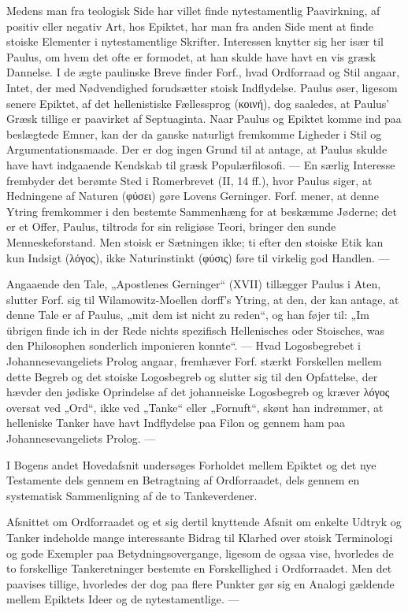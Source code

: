 \documentclass[12pt,a4paper,openany]{book}
\newcommand{\opage}[1]{\marginnote{\footnotesize\textit{[#1]}}}
\begin{document}
Medens man fra teologisk Side har villet finde nytestamentlig
Paavirkning, af positiv eller negativ Art, hos Epiktet,
har man fra anden Side ment at finde stoiske Elementer i nytestamentlige
Skrifter. Interessen knytter sig her især til Paulus,
om hvem det ofte er formodet, at han skulde have havt
en vis græsk Dannelse. I de ægte paulinske Breve finder Forf.,
hvad Ordforraad og Stil angaar, Intet, der med Nødvendighed
forudsætter stoisk Indflydelse. Paulus øser, ligesom senere Epiktet,
af det hellenistiske Fællessprog (κοινή), dog saaledes, at
Paulus’ Græsk tillige er paavirket af Septuaginta. Naar Paulus
og Epiktet komme ind paa beslægtede Emner, kan der da ganske
naturligt fremkomme Ligheder i Stil og Argumentationsmaade.
Der er dog ingen Grund til at antage, at Paulus skulde have
havt indgaaende Kendskab til græsk Populærfilosofi. --- En særlig
Interesse frembyder det berømte Sted i Romerbrevet (II, 14 ff.),
hvor Paulus siger, at Hedningene af Naturen (φύσει) gøre Lovens
Gerninger. Forf. mener, at denne Ytring fremkommer i
den bestemte Sammenhæng for at beskæmme Jøderne; det er
et Offer, Paulus, tiltrods for sin religiøse Teori, bringer den
sunde Menneskeforstand. Men stoisk er Sætningen ikke; ti efter
den stoiske Etik kan kun Indsigt (λόγος), ikke Naturinstinkt
(φύσις) føre til virkelig god Handlen. ---

Angaaende den Tale, „Apostlenes Gerninger“ (XVII) tillægger
Paulus i Aten, slutter Forf. sig til Wilamowitz-Moellen%
\setcounter{footnote}{0}%
\opage{104}dorff’s Ytring, at den, der kan antage, at denne Tale er af
Paulus, „mit dem ist nicht zu reden“, og han føjer til: „Im
übrigen finde ich in der Rede nichts spezifisch Hellenisches
oder Stoisches, was den Philosophen sonderlich imponieren
konnte“. --- Hvad Logosbegrebet i Johannesevangeliets Prolog
angaar, fremhæver Forf. stærkt Forskellen mellem dette Begreb
og det stoiske Logosbegreb og slutter sig til den Opfattelse,
der hævder den jødiske Oprindelse af det johanneiske Logosbegreb
og kræver λόγος oversat ved „Ord“, ikke ved „Tanke“
eller „Fornuft“, skønt han indrømmer, at helleniske Tanker have
havt Indflydelse paa Filon og gennem ham paa Johannesevangeliets
Prolog. ---

I Bogens andet Hovedafsnit undersøges Forholdet mellem
Epiktet og det nye Testamente dels gennem en Betragtning af
Ordforraadet, dels gennem en systematisk Sammenligning af de
to Tankeverdener.

Afsnittet om Ordforraadet og et sig dertil knyttende Afsnit
om enkelte Udtryk og Tanker indeholde mange interessante
Bidrag til Klarhed over stoisk Terminologi og gode Exempler
paa Betydningsovergange, ligesom de ogsaa vise, hvorledes de
to forskellige Tankeretninger bestemte en Forskellighed i Ordforraadet.
Men det paavises tillige, hvorledes der dog paa flere
Punkter gør sig en Analogi gældende mellem Epiktets Ideer og
de nytestamentlige. ---
\end{document}
